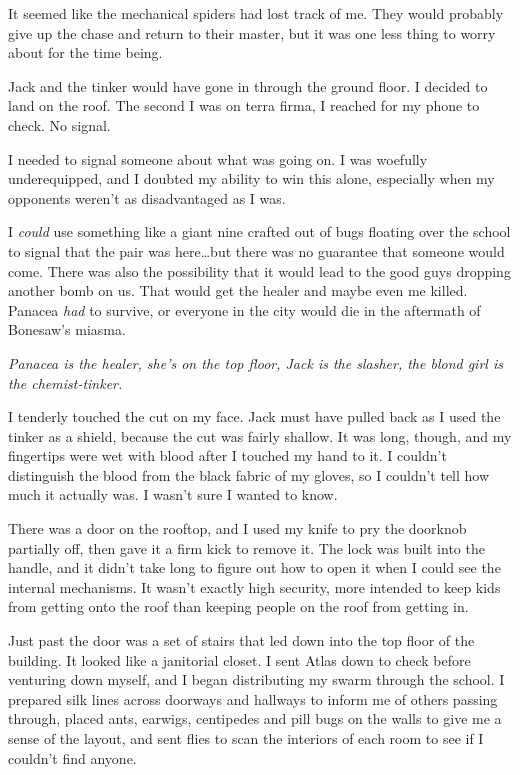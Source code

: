 It seemed like the mechanical spiders had lost track of me.  They would probably give up the chase and return to their master, but it was one less thing to worry about for the time being.



Jack and the tinker would have gone in through the ground floor.  I decided to land on the roof.  The second I was on terra firma, I reached for my phone to check.  No signal.



I needed to signal someone about what was going on.  I was woefully underequipped, and I doubted my ability to win this alone, especially when my opponents weren't as disadvantaged as I was.



I \emph{could} use something like a giant nine crafted out of bugs floating over the school to signal that the pair was here\ldots but there was no guarantee that someone would come.  There was also the possibility that it would lead to the good guys dropping another bomb on us.  That would get the healer and maybe even me killed.  Panacea \emph{had} to survive, or everyone in the city would die in the aftermath of Bonesaw's miasma.



\emph{Panacea is the healer, she's on the top floor, Jack is the slasher, the blond girl is the chemist-tinker.}



I tenderly touched the cut on my face.  Jack must have pulled back as I used the tinker as a shield, because the cut was fairly shallow.  It was long, though, and my fingertips were wet with blood after I touched my hand to it.  I couldn't distinguish the blood from the black fabric of my gloves, so I couldn't tell how much it actually was.  I wasn't sure I wanted to know.



There was a door on the rooftop, and I used my knife to pry the doorknob partially off, then gave it a firm kick to remove it.  The lock was built into the handle, and it didn't take long to figure out how to open it when I could see the internal mechanisms.  It wasn't exactly high security, more intended to keep kids from getting onto the roof than keeping people on the roof from getting in.



Just past the door was a set of stairs that led down into the top floor of the building.  It looked like a janitorial closet.  I sent Atlas down to check before venturing down myself, and I began distributing my swarm through the school.  I prepared silk lines across doorways and hallways to inform me of others passing through, placed ants, earwigs, centipedes and pill bugs on the walls to give me a sense of the layout, and sent flies to scan the interiors of each room to see if I couldn't find anyone.



